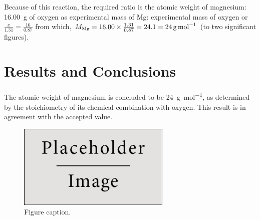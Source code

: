 \documentclass{article}
\begin{document}
\begin{tabular}{ll}
\end{tabular}

Because of this reaction, the required ratio is the atomic weight of magnesium: \SI{16.00}{\gram} of oxygen as experimental mass of Mg: experimental mass of oxygen or $\frac{x}{1.31}=\frac{16}{0.87}$ from which, $M_{\ce{Mg}} = 16.00 \times \frac{1.31}{0.87} = 24.1 = \SI{24}{\gram\per\mole}$ (to two significant figures).


\section{Results and Conclusions}

The atomic weight of magnesium is concluded to be \SI{24}{\gram\per\mol}, as determined by the stoichiometry of its chemical combination with oxygen. This result is in agreement with the accepted value.

\begin{figure}[h]
\begin{center}
\includegraphics[width=0.65\textwidth]{placeholder} %
\caption{Figure caption.}
\end{center}
\end{figure}

\end{document}
